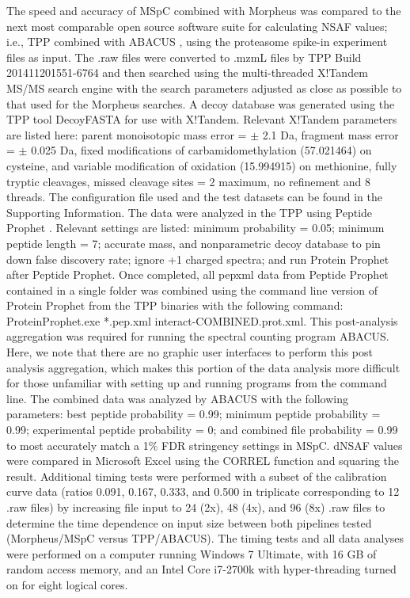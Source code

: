 The speed and accuracy of MSpC combined with Morpheus was compared to the next most comparable open source software suite for calculating NSAF values; i.e., TPP \citep{deutsch10} combined with ABACUS \citep{fermin11}, using the proteasome spike-in experiment files as input.  The .raw files were converted to .mzmL files by TPP Build 201411201551-6764 and then searched using the multi-threaded X!Tandem MS/MS search engine \citep{craig04} with the search parameters adjusted as close as possible to that used for the Morpheus searches.  A decoy database was generated using the TPP tool DecoyFASTA for use with X!Tandem.  Relevant  X!Tandem parameters are listed here: parent monoisotopic mass error = $\pm$ 2.1 Da, fragment mass error = $\pm$ 0.025 Da, fixed modifications of carbamidomethylation (57.021464) on cysteine, and variable modification of oxidation (15.994915) on methionine, fully tryptic cleavages, missed cleavage sites = 2 maximum, no refinement and 8 threads.  The configuration file used and the test datasets can be found in the Supporting Information. The data were analyzed in the TPP using Peptide Prophet \citep{keller02}.  Relevant settings are listed: minimum probability = 0.05; minimum peptide length = 7; accurate mass, and nonparametric decoy database to pin down false discovery rate; ignore +1 charged spectra; and run Protein Prophet \citep{nesvizhskii03} after Peptide Prophet.  
Once completed, all pepxml data from Peptide Prophet contained in a single folder was combined using the command line version of Protein Prophet from the TPP binaries with the following command: ProteinProphet.exe *.pep.xml interact-COMBINED.prot.xml.  This post-analysis aggregation was required for running the spectral counting program ABACUS.  Here, we note that there are no graphic user interfaces to perform this post analysis aggregation, which makes this portion of the data analysis more difficult for those unfamiliar with setting up and running programs from the command line.  The combined data was analyzed by ABACUS with the following parameters: best peptide probability = 0.99; minimum peptide probability = 0.99; experimental peptide probability = 0; and combined file probability = 0.99 to most accurately match a 1\% FDR stringency settings in MSpC.  dNSAF values were compared in Microsoft Excel using the CORREL function and squaring the result.  Additional timing tests were performed with a subset of the calibration curve data (ratios 0.091, 0.167, 0.333, and 0.500 in triplicate corresponding to 12 .raw files) by increasing file input to 24 (2x), 48 (4x), and 96 (8x) .raw files to determine the time dependence on input size between both pipelines tested (Morpheus/MSpC versus TPP/ABACUS).  The timing tests and all data analyses were performed on a computer running Windows 7 Ultimate, with 16 GB of random access memory, and an Intel Core i7-2700k with hyper-threading turned on for eight logical cores.

